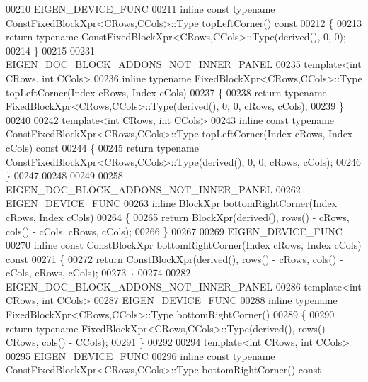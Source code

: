 \begin{DoxyCode}
00210 EIGEN\_DEVICE\_FUNC
00211 \textcolor{keyword}{inline} \textcolor{keyword}{const} \textcolor{keyword}{typename} ConstFixedBlockXpr<CRows,CCols>::Type topLeftCorner()\textcolor{keyword}{ const}
00212 \textcolor{keyword}{}\{
00213   \textcolor{keywordflow}{return} \textcolor{keyword}{typename} ConstFixedBlockXpr<CRows,CCols>::Type(derived(), 0, 0);
00214 \}
00215 
00231 EIGEN\_DOC\_BLOCK\_ADDONS\_NOT\_INNER\_PANEL
00235 \textcolor{keyword}{template}<\textcolor{keywordtype}{int} CRows, \textcolor{keywordtype}{int} CCols>
00236 \textcolor{keyword}{inline} \textcolor{keyword}{typename} FixedBlockXpr<CRows,CCols>::Type topLeftCorner(Index cRows, Index cCols)
00237 \{
00238   \textcolor{keywordflow}{return} \textcolor{keyword}{typename} FixedBlockXpr<CRows,CCols>::Type(derived(), 0, 0, cRows, cCols);
00239 \}
00240 
00242 \textcolor{keyword}{template}<\textcolor{keywordtype}{int} CRows, \textcolor{keywordtype}{int} CCols>
00243 \textcolor{keyword}{inline} \textcolor{keyword}{const} \textcolor{keyword}{typename} ConstFixedBlockXpr<CRows,CCols>::Type topLeftCorner(Index cRows, Index cCols)\textcolor{keyword}{ const}
00244 \textcolor{keyword}{}\{
00245   \textcolor{keywordflow}{return} \textcolor{keyword}{typename} ConstFixedBlockXpr<CRows,CCols>::Type(derived(), 0, 0, cRows, cCols);
00246 \}
00247 
00248 
00249 
00258 EIGEN\_DOC\_BLOCK\_ADDONS\_NOT\_INNER\_PANEL
00262 EIGEN\_DEVICE\_FUNC
00263 \textcolor{keyword}{inline} BlockXpr bottomRightCorner(Index cRows, Index cCols)
00264 \{
00265   \textcolor{keywordflow}{return} BlockXpr(derived(), rows() - cRows, cols() - cCols, cRows, cCols);
00266 \}
00267 
00269 EIGEN\_DEVICE\_FUNC
00270 \textcolor{keyword}{inline} \textcolor{keyword}{const} ConstBlockXpr bottomRightCorner(Index cRows, Index cCols)\textcolor{keyword}{ const}
00271 \textcolor{keyword}{}\{
00272   \textcolor{keywordflow}{return} ConstBlockXpr(derived(), rows() - cRows, cols() - cCols, cRows, cCols);
00273 \}
00274 
00282 EIGEN\_DOC\_BLOCK\_ADDONS\_NOT\_INNER\_PANEL
00286 \textcolor{keyword}{template}<\textcolor{keywordtype}{int} CRows, \textcolor{keywordtype}{int} CCols>
00287 EIGEN\_DEVICE\_FUNC
00288 \textcolor{keyword}{inline} \textcolor{keyword}{typename} FixedBlockXpr<CRows,CCols>::Type bottomRightCorner()
00289 \{
00290   \textcolor{keywordflow}{return} \textcolor{keyword}{typename} FixedBlockXpr<CRows,CCols>::Type(derived(), rows() - CRows, cols() - CCols);
00291 \}
00292 
00294 \textcolor{keyword}{template}<\textcolor{keywordtype}{int} CRows, \textcolor{keywordtype}{int} CCols>
00295 EIGEN\_DEVICE\_FUNC
00296 \textcolor{keyword}{inline} \textcolor{keyword}{const} \textcolor{keyword}{typename} ConstFixedBlockXpr<CRows,CCols>::Type bottomRightCorner()\textcolor{keyword}{ const}

\end{DoxyCode}
